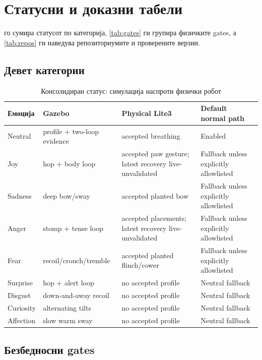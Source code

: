 \chapter{Статусни и доказни табели}
\label{app:status}

 го сумира статусот по категорија,
\cref{tab:gates} ги групира физичките gates, а \cref{tab:repos} ги наведува
репозиториумите и проверените верзии.

\section{Девет категории}

\begin{table}[htbp]
\centering
\caption{Консолидиран статус: симулација наспроти физички робот}
\label{tab:consolidated-status}
\small
\begin{tabularx}{\textwidth}{L{0.14\textwidth}L{0.25\textwidth}YL{0.22\textwidth}}
\toprule
\textbf{Емоција} & \textbf{Gazebo} & \textbf{Physical Lite3} & \textbf{Default normal path} \\
\midrule
Neutral & profile + two-loop evidence & accepted breathing & Enabled \\
Joy & hop + body loop & accepted paw gesture; latest recovery live-unvalidated & Fallback unless explicitly allowlisted \\
Sadness & deep bow/sway & accepted planted bow & Fallback unless explicitly allowlisted \\
Anger & stomp + tense loop & accepted placements; latest recovery live-unvalidated & Fallback unless explicitly allowlisted \\
Fear & recoil/crouch/tremble & accepted planted flinch/cower & Fallback unless explicitly allowlisted \\
Surprise & hop + alert loop & no accepted profile & Neutral fallback \\
Disgust & down-and-away recoil & no accepted profile & Neutral fallback \\
Curiosity & alternating tilts & no accepted profile & Neutral fallback \\
Affection & slow warm sway & no accepted profile & Neutral fallback \\
\bottomrule
\end{tabularx}
\end{table}

\section{Безбедносни gates}

